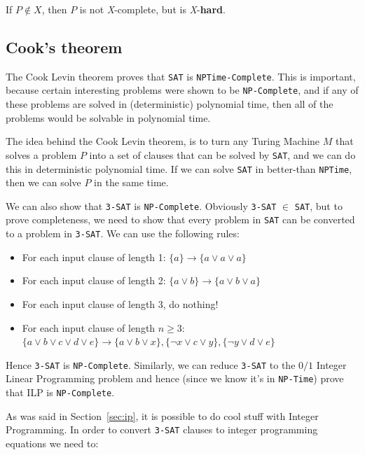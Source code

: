 If $P \notin X$, then $P$ is not \textit{X}-complete, but is
\textit{X}-\textbf{hard}.

\subsection{Cook's theorem}

The Cook Levin theorem proves that \texttt{SAT} is \texttt{NPTime-Complete}.
This is important, because certain interesting problems were shown to be
\texttt{NP-Complete}, and if any of these problems are solved in
(deterministic) polynomial time, then all of the problems would be solvable in
polynomial time.

The idea behind the Cook Levin theorem, is to turn any Turing Machine $M$ that
solves a problem $P$ into a set of clauses that can be solved by \texttt{SAT},
and we can do this in deterministic polynomial time. If we can solve
\texttt{SAT} in better-than \texttt{NPTime}, then we can solve $P$ in the same
time.

We can also show that \texttt{3-SAT} is \texttt{NP-Complete}. Obviously
\texttt{3-SAT} $\in$ \texttt{SAT}, but to prove completeness, we need to show
that every problem in \texttt{SAT} can be converted to a problem in
\texttt{3-SAT}. We can use the following rules:

\begin{itemize}
  \item For each input clause of length 1:
    $\{a\} \rightarrow \{a \vee a \vee a\}$ 
  \item For each input clause of length 2:
    $\{a \vee b\} \rightarrow \{a \vee b \vee a\}$ 
  \item For each input clause of length 3, do nothing!
  \item For each input clause of length $n \geq 3$:
    $\{a \vee b \vee c \vee d \vee e\} \rightarrow
      \{a \vee b \vee x\},
      \{\neg x \vee c \vee y\},
      \{\neg y \vee d \vee e\}$ 
\end{itemize}

Hence \texttt{3-SAT} is \texttt{NP-Complete}. Similarly, we can reduce
\texttt{3-SAT} to the $0/1$ Integer Linear Programming problem and hence (since
we know it's in \texttt{NP-Time}) prove that ILP is \texttt{NP-Complete}.

As was said in Section~\ref{sec:ip}, it is possible to do cool stuff with
Integer Programming. In order to convert \texttt{3-SAT} clauses to integer
programming equations we need to:

